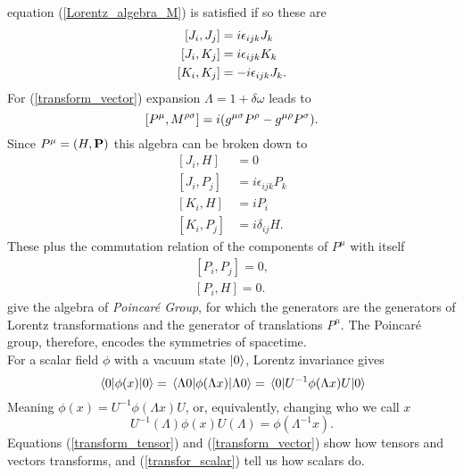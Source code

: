 equation (\ref{Lorentz_algebra_M}) is satisfied if so these are
\begin{equation}
    \begin{aligned}
    \comm{J_i}{J_j}&=i\epsilon_{ijk}J_k\\
    \comm{J_i}{K_j}&=i\epsilon_{ijk}K_k\\
    \comm{K_i}{K_j}&=-i\epsilon_{ijk}J_k.
    \end{aligned}
    \label{lorentz_algebra_JK}
\end{equation}
For (\ref{transform_vector}) expansion $\Lambda=1+\delta\omega$ leads to
\begin{equation}
    \comm{P^\mu}{M^{\rho\sigma}}=i(g^{\mu\sigma}P^\rho-g^{\mu\rho}P^\sigma).
\end{equation}
Since $P^\mu=(H,\vb{P})$ this algebra can be broken down to
\begin{equation}
\begin{aligned}
\left[J_{i}, H\right] &=0 \\
\left[J_{i}, P_{j}\right] &=i \epsilon_{i j k} P_{k} \\
\left[K_{i}, H\right] &=i  P_{i} \\
\left[K_{i}, P_{j}\right] &=i \delta_{i j} H .
\end{aligned}
\end{equation}
These plus the commutation relation of the components of $P^\mu$ with itself
\begin{equation}
\begin{array}{l}
{\left[P_{i}, P_{j}\right]=0,} \\
{\left[P_{i}, H\right]=0 .}
\end{array}
\end{equation}
give the algebra of \textit{Poincaré Group}, for which the generators are the generators of Lorentz transformations and the generator of translations $P^\mu$. The Poincaré group, therefore, encodes the symmetries of spacetime.\\

For a scalar field $\phi$ with a vacuum state $\ket{0}$, Lorentz invariance gives
\begin{equation}
    \vev{\phi(x)}=\ev{\phi(\Lambda x)}{\Lambda 0}=\vev{U^{-1}\phi(\Lambda x)U}
\end{equation}
Meaning $\phi(x)=U^{-1}\phi(\Lambda x)U$, or, equivalently, changing who we call $x$
\begin{equation}
    U^{-1}(\Lambda)\phi(x)U(\Lambda)=\phi(\Lambda^{-1}x).
    \label{transfor_scalar}
\end{equation}
Equations (\ref{transform_tensor}) and (\ref{transform_vector}) show how tensors and vectors transforms, and (\ref{transfor_scalar}) tell us how scalars do.\\


